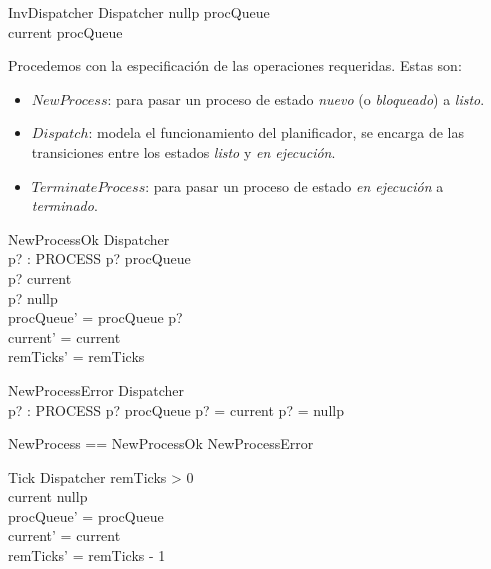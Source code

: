 \documentclass{article}
\begin{document}
\begin{schema}{InvDispatcher}
    Dispatcher
\where
    \lnot \langle nullp \rangle \inseq procQueue \\
    \lnot \langle current \rangle \inseq procQueue
\end{schema}

Procedemos con la especificación de las operaciones requeridas. Estas son:
\begin{itemize}
    \item $NewProcess$: para pasar un proceso de estado \textit{nuevo} (o \textit{bloqueado}) a \textit{listo}.
    \item $Dispatch$: modela el funcionamiento del planificador, se encarga de las transiciones entre los estados \textit{listo} y \textit{en ejecución}.
    \item $TerminateProcess$: para pasar un proceso de estado \textit{en ejecución} a \textit{terminado}.
\end{itemize}

\begin{schema}{NewProcessOk}
    \Delta Dispatcher \\
    p? : PROCESS
\where
    p? \notin \ran procQueue \\
    p? \neq current \\
    p? \neq nullp \\
    procQueue' = procQueue \cat \langle p? \rangle \\
    current' = current \\
    remTicks' = remTicks
\end{schema}

\begin{schema}{NewProcessError}
    \Xi Dispatcher \\
    p? : PROCESS
\where
    p? \in \ran procQueue \lor p? = current \lor p? = nullp
\end{schema}

\begin{zed}
    NewProcess == NewProcessOk \lor NewProcessError
\end{zed}

\begin{schema}{Tick}
    \Delta Dispatcher
\where
    remTicks > 0 \\
    current \neq nullp \\
    procQueue' = procQueue \\
    current' = current \\
    remTicks' = remTicks - 1    
\end{schema}
\end{document}
